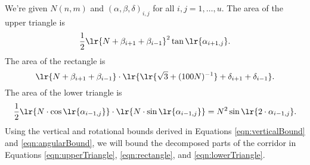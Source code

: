 We're given $N(n,m)$ and $(\alpha, \beta, \delta)_{i,j}$ for all $i,j = 1, \dots, u$. 
The area of the upper triangle is 
\begin{equation}\label{eqn:upperTriangle}
\frac{1}{2}\lr{N+\beta_{i+1} + \beta_{i-1}}^2 \tan \lr{\alpha_{i+1,j}}.
\end{equation}
The area of the rectangle is 
\begin{equation}\label{eqn:rectangle}
\lr{N + \beta_{i+1} + \beta_{i-1}} \cdot \lr{\lr{\sqrt{3} + (100N)^{-1}} + \delta_{i+1} + \delta_{i-1}}.
\end{equation}
The area of the lower triangle is 
\begin{equation}\label{eqn:lowerTriangle}
\frac{1}{2} \lr{N \cdot \cos \lr{ \alpha_{i-1,j} } } \cdot \lr{N \cdot \sin \lr{\alpha_{i-1,j}} }= N^2 \sin \lr{2 \cdot \alpha_{i-1,j}}.
\end{equation}
Using the vertical and rotational bounds derived in Equations \ref{eqn:verticalBound} and \ref{eqn:angularBound},  we will bound the decomposed parts of the corridor in Equations \ref{eqn:upperTriangle}, \ref{eqn:rectangle}, and \ref{eqn:lowerTriangle}.

